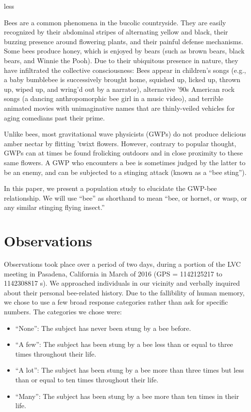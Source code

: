 less\documentclass[aps,prl,preprint,groupedaddress,twocolumn]{revtex4-1}
\begin{document}
Bees are a common phenomena in the bucolic countryside. They are easily
recognized by their abdominal stripes of alternating yellow and black, their
buzzing presence around flowering plants, and their painful defense
mechanisms. Some bees produce honey, which is enjoyed by bears (such as
brown bears, black bears, and Winnie the Pooh). Due to their ubiquitous
presence in nature, they have infiltrated the collective consciousness:
Bees appear in children's songs (e.g., a baby bumblebee is successively
brought home, squished up, licked up, thrown up, wiped up, and wring'd out
by a narrator), alternative '90s American rock songs (a dancing
anthropomorphic bee girl in a music video), and terrible animated movies
with unimaginative names that are thinly-veiled vehicles for aging comedians
past their prime.

Unlike bees, most gravitational wave physicists (GWPs) do not produce delicious amber
nectar by flitting 'twixt flowers. However, contrary to popular thought,
GWPs can at times be found frolicking outdoors and in close proximity to these
same flowers. A GWP who encounters a bee is sometimes judged by the latter
to be an enemy, and can be subjected to a stinging attack (known as a
``bee sting'').

In this paper, we present a population study to elucidate the
GWP-bee relationship. We will use ``bee'' as shorthand
to mean ``bee, or hornet, or wasp, or any similar stinging flying insect.''


\section{Observations}

Observations took place over a period of two days, during a portion of
the LVC meeting in Pasadena, California in March of 2016 (GPS = 1142125217
to 1142308817 s). We approached individuals in our vicinity and verbally
inquired about their personal bee-related history. Due to the fallibility
of human memory, we chose to use a few broad response categories rather
than ask for specific numbers. The categories we chose were:
\begin{itemize}
\item ``None'': The subject has never been stung by a bee before.
\item ``A few'': The subject has been stung by a bee less than or equal
  to three times throughout their life.
\item ``A lot'': The subject has been stung by a bee more than three times
  but less than or equal to ten times throughout their life.
\item ``Many'': The subject has been stung by a bee more than ten times
  in their life.
\end{itemize}
\end{document}
